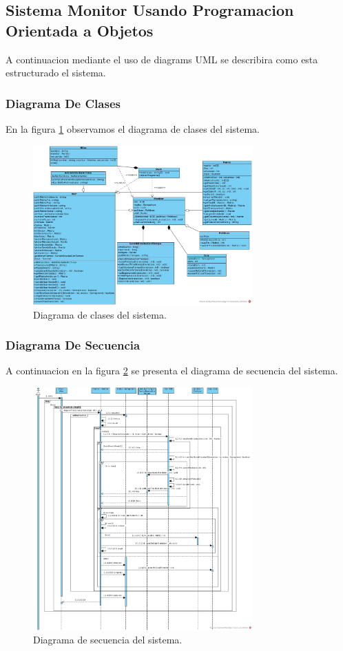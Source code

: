 \documentclass{article}
\begin{document}
	\subsection{Sistema Monitor Usando Programacion Orientada a Objetos}
	A continuacion mediante el uso de diagrams UML se describira como esta estructurado el sistema.
		\subsubsection{Diagrama De Clases}
		En la figura \ref{fig:mesh2} observamos el diagrama de clases del sistema.
		\begin{figure}[H]
			\centering
			\includegraphics[width=0.75\textwidth]{Diagrama_de_Clase}
			\caption{Diagrama de clases del sistema.}
			\label{fig:mesh2}
		\end{figure}
		\subsubsection{Diagrama De Secuencia}
		A continuacion en la figura \ref{fig:mesh3} se presenta el diagrama de secuencia del sistema.
		\begin{figure}[H]
			\centering
			\includegraphics[width=0.75\textwidth]{Diagrama_de_secuencia}
			\caption{Diagrama de secuencia del sistema.}
			\label{fig:mesh3}
		\end{figure}
\end{document}
